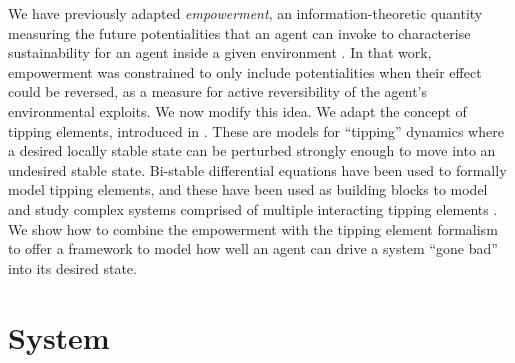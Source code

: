 \documentclass[conference]{IEEEtran}
\begin{document}


We have previously adapted \emph{empowerment}, an
information-theoretic quantity measuring the future potentialities
that an agent can invoke to characterise sustainability for an agent
inside a given environment \cite{Kim2009_sustainability}. In that
work, empowerment was constrained to only include potentialities when
their effect could be reversed, as a measure for active reversibility
of the agent's environmental exploits. We now modify this idea. We
adapt the concept of tipping elements, introduced in
\cite{Lenton2008_tippingelements}. These are models for ``tipping''
dynamics where a desired locally stable state can be perturbed strongly
enough to move into an undesired stable state.  Bi-stable differential
equations have been used to formally model tipping elements, and these
have been used as building blocks to model and study complex systems
comprised of multiple interacting tipping elements
\cite{Brummitt2015_coupledcatastrophes,Klose2019_interactingtippingelements}.
We show how to combine the empowerment with the tipping element
formalism to offer a framework to model how well an agent can drive a
system ``gone bad'' into its desired state.





\section{System}
\end{document}
